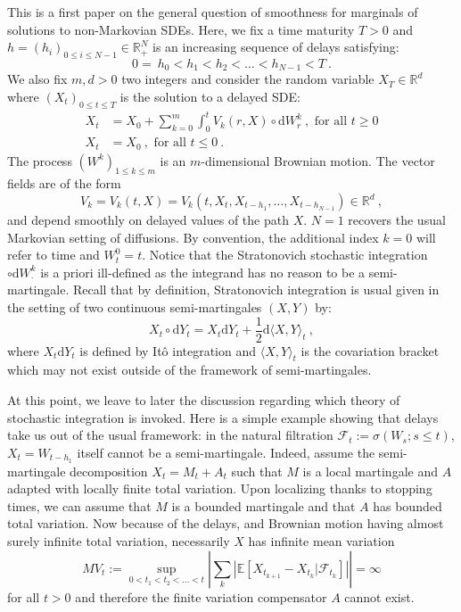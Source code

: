 \documentclass[11pt]{article}
\theoremstyle{definition}
\numberwithin{equation}{section}
\numberwithin{figure}{section}
\numberwithin{table}{section}
\newcommand*\half{\frac{1}{2}}
\newcommand*\R{\mathbb{R}}
\newcommand*\E{\mathbb{E}}
\newcommand*\Fc{\mathcal{F}}
\newcommand*{\dd}{\mathrm{d}}
\newcommand*{\dW}{\dd W}
\newcommand*{\dY}{\dd Y}
\begin{document}
This is a first paper on the general question of smoothness for marginals of solutions to non-Markovian SDEs. Here, we fix a time maturity $T>0$ and $h = \left(h_i \right)_{0 \leq i \leq N-1} \in \R_+^N$ is an increasing sequence of delays satisfying:
\begin{equation}\label{eq:delays}
0 = \ h_0 < h_1 < h_2 < \dots < h_{N-1} < T \ .
\end{equation}
We also fix $m,d>0$ two integers and consider the random variable $X_T \in \R^d$ where $\left(X_t \right)_{0 \leq t \leq T}$ is the solution to a delayed SDE:
\begin{align}\label{eq:sde_def}
X_t & = X_0 + \sum_{k=0}^m \int_0^t V_k(r,X) \circ \dW^k_r \ , \text{ for all }t\geq 0\\
X_t & = X_0 \ ,\text{ for all }t\leq 0 \ .
\end{align}
The process $(W^k)_{1\leq k\leq m}$ is an $m$-dimensional Brownian motion. The vector fields are of the form
\[
V_k = V_k(t,X) = V_k\left(t, X_{t},X_{t-h_1},\dots, X_{t-h_{N-1}} \right) \in \R^d \ ,
\]
and depend smoothly on delayed values of the path $X$. $N=1$ recovers the usual Markovian setting of diffusions. By convention, the additional index $k=0$ will refer to time and $W_t^0=t$. Notice that the Stratonovich stochastic integration $\circ \dW^k_\cdot$ is a priori ill-defined as the integrand has no reason to be a semi-martingale. Recall that by definition, Stratonovich integration is usual given in the setting of two continuous semi-martingales $(X,Y)$ by:
\[
X_t \circ \dY_t = X_t \dY_t + \half \dd \langle X, Y \rangle_t \ ,
\]
where $X_t \dY_t$ is defined by Itô integration and $\langle X, Y \rangle_t$ is the covariation bracket which may not exist outside of the framework of semi-martingales.

At this point, we leave to later the discussion regarding which theory of stochastic integration is invoked. Here is a simple example showing that delays take us out of the usual framework: in the natural filtration $\Fc_t := \sigma\left(W_s ; s \leq t \right)$, $X_t = W_{t-h_1}$ itself cannot be a semi-martingale. Indeed, assume the semi-martingale decomposition $X_t = M_t + A_t$ such that $M$ is a local martingale and $A$ adapted with locally finite total variation. Upon localizing thanks to stopping times, we can assume that $M$ is a bounded martingale and that $A$ has bounded total variation. Now because of the delays, and Brownian motion having almost surely infinite total variation, necessarily $X$ has infinite mean variation
\[
MV_t := \sup_{0 < t_1 < t_2 < \dots < t}
\left| \sum_k \left|\E \left[X_{t_{k+1}} - X_{t_{k}}| \Fc_{t_k} \right]\right| \right|
= \infty
\]
for all $t>0$ and therefore the finite variation compensator $A$ cannot exist.
\end{document}
